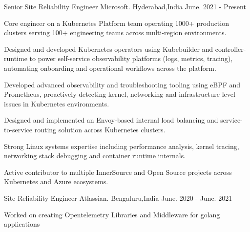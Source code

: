 

\begin{cventries}

    \cventry
    {Senior Site Reliability Engineer} %
    {Microsoft.} %
    {Hyderabad,India} %
    {June. 2021 - Present} %
    {
      \begin{cvitems} %
         \item { Core engineer on a Kubernetes Platform team operating 1000+ production clusters serving 100+ engineering teams across multi-region environments.}
	       \item { Designed and developed Kubernetes operators using Kubebuilder and controller-runtime to power self-service observability platforms (logs, metrics, tracing), automating onboarding and operational workflows across the platform.}
	       \item { Developed advanced observability and troubleshooting tooling using eBPF and Prometheus, proactively detecting kernel, networking and infrastructure-level issues in Kubernetes environments.}
           \item { Designed and implemented an Envoy-based internal load balancing and service-to-service routing solution across Kubernetes clusters.}
         \item { Strong Linux systems expertise including performance analysis, kernel tracing, networking stack debugging and container runtime internals.}
         \item { Active contributor to multiple InnerSource and Open Source projects across Kubernetes and Azure ecosystems.}
	  \end{cvitems}
    }
    \cventry
    {Site Reliability Engineer} %
    {Atlassian.} %
    {Bengaluru,India} %
    {June. 2020 - June. 2021} %
    {
      \begin{cvitems} %
               \item { Worked on creating Opentelemetry Libraries and Middleware for golang applications }

\end{cvitems}}
\end{cventries}
